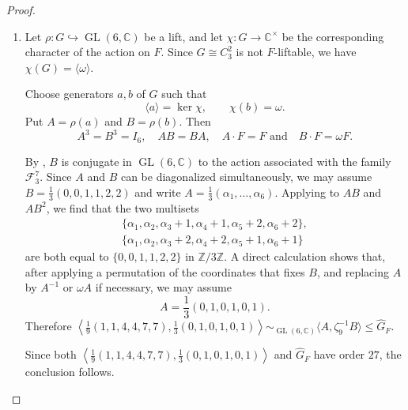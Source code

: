 \documentclass[12pt]{amsart}
\numberwithin{equation}{section}
\theoremstyle{plain}
\theoremstyle{definition}
\theoremstyle{remark}
\newcommand{\CC}{\mathbb C}
\newcommand{\ZZ}{\mathbb Z}
\newcommand{\calF}{\mathcal F}
\DeclareMathOperator{\GL}{GL}
\begin{document}
\begin{proof}
\begin{enumerate}
If $\chi$ is trivial, then
$E\leq\widehat G_F$.  Since both $E$ and
$\widehat G_F$ have order $27$, they are equal, and the
conclusion follows.

Suppose that $\chi$ is nontrivial.  Then
$\chi(G)=\chi_E(E)=\langle\omega\rangle$.  Therefore there is a pair
$(u,v)\in\{0,1,2\}^2\setminus\{(0,0)\}$ such that
$\zeta_9^uP,\zeta_9^vW\in\widehat G_F$.

One checks directly that, for any
$(u,v)\in\{0,1,2\}^2\setminus\{(0,0)\}$,
\[
\langle \zeta_9^u P,\zeta_9^v W\rangle\sim_{\GL(6,\CC)} \left\langle
(1\;2\;3)(4\;5\;6),
\frac19(1,4,7,1,4,7)
\right\rangle.
\]
Since both $\langle \zeta_9^u P,\zeta_9^v W\rangle$ and
$\widehat G_F$ have order $27$, the conclusion follows.
\item
Let $\rho\colon G\hookrightarrow\GL(6,\CC)$ be a lift, and let
$\chi\colon G\to\CC^\times$ be the corresponding character of the action
on $F$.  Since $G\cong C_3^2$ is not $F$-liftable, we have
$\chi(G)=\langle\omega\rangle$.

Choose generators $a,b$ of $G$ such that
\[
\langle a\rangle=\ker\chi,
\qquad
\chi(b)=\omega.
\]
Put $A=\rho(a)$ and $B=\rho(b)$.  Then
\[
A^3=B^3=I_6,\quad AB=BA,\quad A\cdot F=F
\text{ and}\quad B\cdot F=\omega F.
\]

By \cite[Theorem~3.8]{gonzalez2011automorphisms}, $B$ is conjugate in
$\GL(6,\CC)$ to the action associated with the family $\calF_3^7$.  Since
$A$ and $B$ can be diagonalized simultaneously, we may assume
$B=\frac{1}{3}(0,0,1,1,2,2)$ and write
$A=\frac{1}{3}(\alpha_1,\ldots,\alpha_6)$.  Applying
\cite[Theorem~3.8]{gonzalez2011automorphisms} to $AB$ and $AB^2$, we find
that the two multisets
\[
\begin{gathered}
\{\alpha_1,\alpha_2,\alpha_3+1,\alpha_4+1,\alpha_5+2,\alpha_6+2\},\\
\{\alpha_1,\alpha_2,\alpha_3+2,\alpha_4+2,\alpha_5+1,\alpha_6+1\}
\end{gathered}
\]
are both equal to $\{0,0,1,1,2,2\}$ in $\ZZ/3\ZZ$.  A direct calculation shows that,
after applying a permutation of the coordinates that fixes $B$, and
replacing $A$ by $A^{-1}$ or $\omega A$ if necessary, we may assume
\[
A=\frac13(0,1,0,1,0,1).
\]
Therefore $\left\langle
\frac19(1,1,4,4,7,7),
\frac13(0,1,0,1,0,1)
\right\rangle\sim_{\GL(6,\CC)}\langle A,\zeta_9^{-1} B\rangle
\leq \widehat G_F$.

Since both $\left\langle
\frac19(1,1,4,4,7,7),
\frac13(0,1,0,1,0,1)
\right\rangle$ and $\widehat G_F$ have order $27$, the conclusion follows.

\end{enumerate}

\end{proof}
\end{document}
